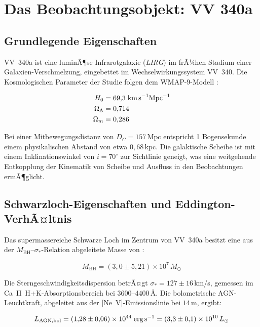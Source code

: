 ﻿\documentclass[12pt,a4paper]{report}
\begin{document}
\section{Das Beobachtungsobjekt: VV 340a}

\subsection{Grundlegende Eigenschaften}

VV~340a ist eine luminÃ¶se Infrarotgalaxie (\textit{LIRG}) im frÃ¼hen Stadium einer Galaxien-Verschmelzung, eingebettet im Wechselwirkungssystem VV~340. Die Kosmologischen Parameter der Studie folgen dem WMAP-9-Modell \cite{kader2026}:

\begin{align}
	H_0 &= 69{,}3\;\text{km\,s}^{-1}\text{Mpc}^{-1} \\
	\Omega_\Lambda &= 0{,}714 \\
	\Omega_m &= 0{,}286
\end{align}

Bei einer Mitbewegungsdistanz von $D_C = 157\,\text{Mpc}$ entspricht 1 Bogensekunde einem physikalischen Abstand von etwa $0{,}68$\,kpc. Die galaktische Scheibe ist mit einem Inklinations\-winkel von $i = 70^\circ$ zur Sichtlinie geneigt, was eine weitgehende Entkopplung der Kinematik von Scheibe und Ausfluss in den Beobachtungen ermÃ¶glicht.

\subsection{Schwarzloch-Eigenschaften und Eddington-VerhÃ¤ltnis}

Das supermassereiche Schwarze Loch im Zentrum von VV~340a besitzt eine aus der $M_\mathrm{BH}$--$\sigma_*$-Relation abgeleitete Masse von \cite{kader2026}:

\begin{equation}
	\boxed{M_\mathrm{BH} = (3{,}0 \pm 5{,}21) \times 10^7\,M_\odot}
\end{equation}

Die Sterngeschwindigkeitsdispersion betrÃ¤gt $\sigma_* = 127 \pm 16$\,km/s, gemessen im Ca~II~H+K-Absorptionsbereich bei $3600$--$4400$\,\AA. Die bolometrische AGN-Leuchtkraft, abgeleitet aus der [Ne~V]-Emissionslinie bei $14$\,\textmu m, ergibt:

\begin{equation}
	L_\mathrm{AGN,bol} = (1{,}28 \pm 0{,}06) \times 10^{44}\;\text{erg\,s}^{-1} = (3{,}3 \pm 0{,}1) \times 10^{10}\,L_\odot
\end{equation}
\end{document}

